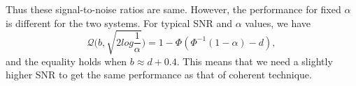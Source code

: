 \documentclass[a4paper,english,12pt]{article}
\begin{document}
\par Thus these signal-to-noise ratios are same. However, the performance for fixed $\alpha$ is different for the two systems. For typical SNR and $\alpha$ values, we have
\begin{equation}
 \label{n21}
\mathcal{Q}\bigg(b,\sqrt{2log\frac{1}{\alpha}}\bigg)  =1-\Phi(\Phi^{-1}(1-\alpha)-d),
\end{equation} 
and the equality holds when $b\approx d+0.4$. This means that we need a slightly higher SNR to get the same performance as that of coherent technique.
\end{document}
